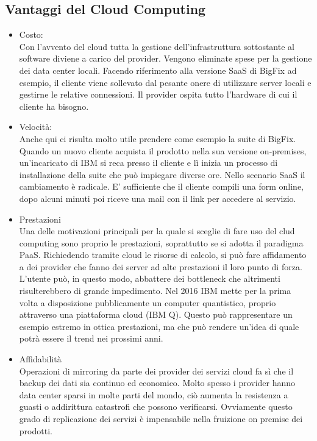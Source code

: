 \subsection{Vantaggi del Cloud Computing}
\begin{itemize}
	\item Costo: \\
	Con l'avvento del cloud tutta la gestione dell'infrastruttura sottostante al software diviene a carico del provider. Vengono eliminate spese per la gestione dei data center locali. Facendo riferimento alla versione SaaS di BigFix ad esempio, il cliente viene sollevato dal pesante onere di utilizzare server locali e gestirne le relative connessioni. Il provider ospita tutto l'hardware di cui il cliente ha bisogno.
	
	\item Velocità: \\
	Anche qui ci risulta molto utile prendere come esempio la suite di BigFix. Quando un nuovo cliente acquista il prodotto nella sua versione on-premises, un'incaricato di IBM si reca presso il cliente e lì inizia un processo di installazione della suite che può impiegare diverse ore. Nello scenario SaaS il cambiamento è radicale. E' sufficiente che il cliente compili una form online, dopo alcuni minuti poi riceve una mail con il link per accedere al servizio.
	
	\item Prestazioni \\
	Una delle motivazioni principali per la quale si sceglie di fare uso del clud computing sono proprio le prestazioni, soprattutto se si adotta il paradigma PaaS. Richiedendo tramite cloud le risorse di calcolo, si può fare affidamento a dei provider che fanno dei server ad alte prestazioni il loro punto di forza. L'utente può, in questo modo, abbattere dei bottleneck che altrimenti risulterebbero di grande impedimento. Nel 2016 IBM mette per la prima volta a disposizione pubblicamente un computer quantistico, proprio attraverso una piattaforma cloud (IBM Q). Questo può rappresentare un esempio estremo in ottica prestazioni, ma che può rendere un'idea di quale potrà essere il trend nei prossimi anni.
	
	\item Affidabilità \\
	Operazioni di mirroring da parte dei provider dei servizi cloud fa sì che il backup dei dati sia continuo ed economico. Molto spesso i provider hanno data center sparsi in molte parti del mondo, ciò aumenta la resistenza a guasti o addirittura catastrofi che possono verificarsi. Ovviamente questo grado di replicazione dei servizi è impensabile nella fruizione on premise dei prodotti.
\end{itemize}

